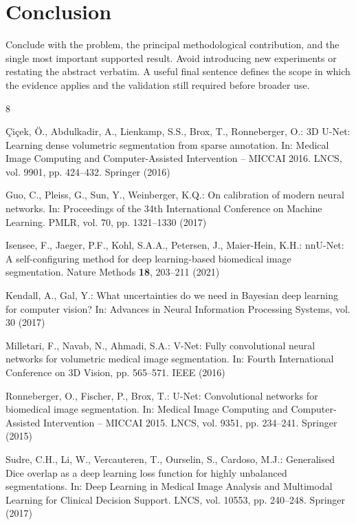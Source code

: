 \section{Conclusion}
\label{sec:conclusion}

Conclude with the problem, the principal methodological contribution, and the
single most important supported result.  Avoid introducing new experiments or
restating the abstract verbatim.  A useful final sentence defines the scope in
which the evidence applies and the validation still required before broader
use.


\begin{thebibliography}{8}

Çiçek, Ö., Abdulkadir, A., Lienkamp, S.S., Brox, T., Ronneberger, O.:
3D U-Net: Learning dense volumetric segmentation from sparse annotation.
In: Medical Image Computing and Computer-Assisted Intervention -- MICCAI 2016.
LNCS, vol. 9901, pp. 424--432. Springer (2016)

Guo, C., Pleiss, G., Sun, Y., Weinberger, K.Q.:
On calibration of modern neural networks.
In: Proceedings of the 34th International Conference on Machine Learning.
PMLR, vol. 70, pp. 1321--1330 (2017)

Isensee, F., Jaeger, P.F., Kohl, S.A.A., Petersen, J., Maier-Hein, K.H.:
nnU-Net: A self-configuring method for deep learning-based biomedical image
segmentation. Nature Methods \textbf{18}, 203--211 (2021)

Kendall, A., Gal, Y.:
What uncertainties do we need in Bayesian deep learning for computer vision?
In: Advances in Neural Information Processing Systems, vol. 30 (2017)

Milletari, F., Navab, N., Ahmadi, S.A.:
V-Net: Fully convolutional neural networks for volumetric medical image
segmentation. In: Fourth International Conference on 3D Vision, pp. 565--571.
IEEE (2016)

Ronneberger, O., Fischer, P., Brox, T.:
U-Net: Convolutional networks for biomedical image segmentation.
In: Medical Image Computing and Computer-Assisted Intervention -- MICCAI 2015.
LNCS, vol. 9351, pp. 234--241. Springer (2015)

Sudre, C.H., Li, W., Vercauteren, T., Ourselin, S., Cardoso, M.J.:
Generalised Dice overlap as a deep learning loss function for highly unbalanced
segmentations. In: Deep Learning in Medical Image Analysis and Multimodal
Learning for Clinical Decision Support. LNCS, vol. 10553, pp. 240--248.
Springer (2017)

\end{thebibliography}
